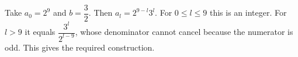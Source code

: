 Take $a_0=2^9$ and $b=\dfrac{3}{2}$. Then $a_l=2^{9-l}3^l$. For $0\le l\le9$ this is an integer. For $l>9$ it equals $\dfrac{3^l}{2^{l-9}}$, whose denominator cannot cancel because the numerator is odd. This gives the required construction.
